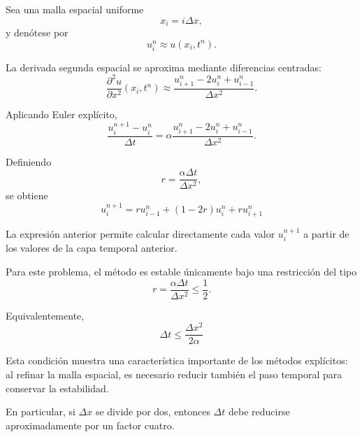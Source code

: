 \documentclass[12pt]{article}
\begin{document}
Sea una malla espacial uniforme
\begin{equation}
    x_i=i\Delta x,
\end{equation}
y denótese por
\begin{equation}
    u_i^n
    \approx
    u(x_i,t^n).
\end{equation}

La derivada segunda espacial se aproxima mediante diferencias centradas:
\begin{equation}
    \frac{\partial^2u}{\partial x^2}(x_i,t^n)
    \approx
    \frac{
        u_{i+1}^n
        -
        2u_i^n
        +
        u_{i-1}^n
    }{\Delta x^2}.
\end{equation}

Aplicando Euler explícito,
\begin{equation}
    \frac{u_i^{n+1}-u_i^n}{\Delta t}
    =
    \alpha
    \frac{
        u_{i+1}^n
        -
        2u_i^n
        +
        u_{i-1}^n
    }{\Delta x^2}.
\end{equation}

Definiendo
\begin{equation}
    r
    =
    \frac{\alpha\Delta t}{\Delta x^2},
\end{equation}
se obtiene
\begin{equation}
    \boxed{
    u_i^{n+1}
    =
    r u_{i-1}^n
    +
    (1-2r)u_i^n
    +
    r u_{i+1}^n
    }
\end{equation}

La expresión anterior permite calcular directamente cada valor $u_i^{n+1}$ a partir de los valores de la capa temporal anterior.

Para este problema, el método es estable únicamente bajo una restricción del tipo
\begin{equation}
    r
    =
    \frac{\alpha\Delta t}{\Delta x^2}
    \leq
    \frac{1}{2}.
\end{equation}

Equivalentemente,
\begin{equation}
    \boxed{
    \Delta t
    \leq
    \frac{\Delta x^2}{2\alpha}
    }
\end{equation}

Esta condición muestra una característica importante de los métodos explícitos: al refinar la malla espacial, es necesario reducir también el paso temporal para conservar la estabilidad.

En particular, si $\Delta x$ se divide por dos, entonces $\Delta t$ debe reducirse aproximadamente por un factor cuatro.
\end{document}

